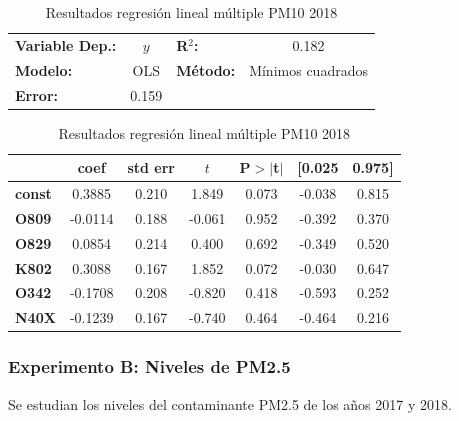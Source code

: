 \documentclass[3p,times]{elsarticle}
\begin{document}
\begin{table}[hbt!]
\caption{Resultados regresión lineal múltiple PM10 2018}
\label{tab:RRLM PM10 2018}
\begin{center}
\begin{tabular}{lclc}
\toprule
\textbf{Variable Dep.:}    &        $y$         & \textbf{  R$^2$:         } &     0.182   \\
\textbf{Modelo:}            &       OLS        & \textbf{Método:}           &  Mínimos cuadrados  \\
\textbf{Error:}            & 0.159  \\
\bottomrule
\end{tabular}
\begin{tabular}{lcccccc}
               & \textbf{coef} & \textbf{std err} & \textbf{$t$} & \textbf{P$> |$t$|$} & \textbf{[0.025} & \textbf{0.975]}  \\
\midrule
\textbf{const} &       0.3885  &        0.210     &     1.849  &         0.073        &       -0.038    &        0.815     \\
\textbf{O809}  &      -0.0114  &        0.188     &    -0.061  &         0.952        &       -0.392    &        0.370     \\
\textbf{O829}  &       0.0854  &        0.214     &     0.400  &         0.692        &       -0.349    &        0.520     \\
\textbf{K802}  &       0.3088  &        0.167     &     1.852  &         0.072        &       -0.030    &        0.647     \\
\textbf{O342}  &      -0.1708  &        0.208     &    -0.820  &         0.418        &       -0.593    &        0.252     \\
\textbf{N40X}  &      -0.1239  &        0.167     &    -0.740  &         0.464        &       -0.464    &        0.216     \\
\bottomrule
\end{tabular}
\end{center}
\end{table}

\clearpage
\subsubsection{Experimento B: Niveles de PM2.5}
Se estudian los niveles del contaminante PM2.5 de los años 2017 y 2018.
\end{document}
